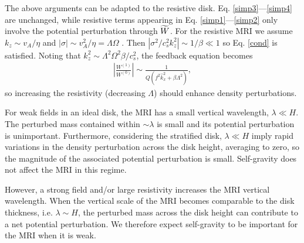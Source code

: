 
 The above arguments can be adapted to the resistive
 disk. Eq. \ref{simp3}---\ref{simp4} are unchanged, while resistive
 terms appearing in Eq. \ref{simp1}---\ref{simp2} only involve the
 potential perturbation through $\widetilde{W}$. For the resistive MRI we assume
 $k_z\sim v_A/\eta$ and $|\sigma|\sim v_A^2/\eta = \Lambda\Omega$
 \citep{sano99}. Then $|\sigma^2/c_s^2k_z^2|\sim 1/\beta \ll 1$ so
 Eq. \ref{cond} is satisfied. Noting that $k_z^2\sim
 \Lambda^2\Omega^2\beta/c_s^2$, the feedback equation becomes
 \begin{align}
   \left|\frac{W^{(1)}}{W^{(0)}}\right| \sim
   \frac{1}{Q\left(f^2\hat{k}_x^2 + \beta\Lambda^2\right)},
 \end{align}
 so increasing the resistivity (decreasing $\Lambda$) should enhance
 density perturbations.  


 For weak fields in an ideal disk, the MRI has a small vertical
 wavelength, $\lambda \ll H$. The perturbed mass contained within
 $\sim \lambda$ is small and its potential
 perturbation is unimportant. Furthermore, considering the stratified
 disk, $\lambda\ll H$ imply rapid variations in the density
 perturbation across the disk height, averaging to zero, so the
 magnitude of the associated potential perturbation is small. 
 Self-gravity does not affect the MRI in this regime.   
 
 
 However, a strong field and/or large resistivity increases the MRI
 vertical wavelength. When the vertical scale of the MRI becomes
 comparable to the disk thickness, i.e. $\lambda\sim H$, the
 perturbed mass across the disk height can contribute to a net potential
 perturbation. We therefore expect self-gravity to be important for
 the MRI when it is weak.  

